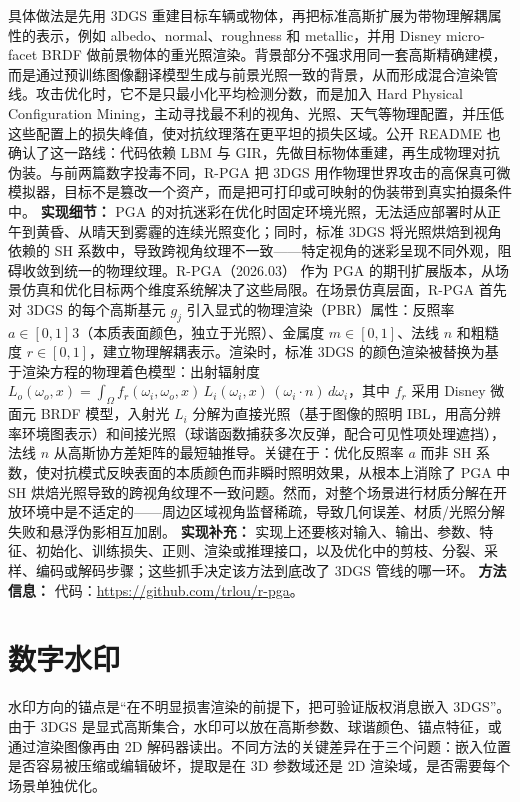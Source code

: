 具体做法是先用 3DGS 重建目标车辆或物体，再把标准高斯扩展为带物理解耦属性的表示，例如 albedo、normal、roughness 和 metallic，并用 Disney micro-facet BRDF 做前景物体的重光照渲染。背景部分不强求用同一套高斯精确建模，而是通过预训练图像翻译模型生成与前景光照一致的背景，从而形成混合渲染管线。攻击优化时，它不是只最小化平均检测分数，而是加入 Hard Physical Configuration Mining，主动寻找最不利的视角、光照、天气等物理配置，并压低这些配置上的损失峰值，使对抗纹理落在更平坦的损失区域。公开 README 也确认了这一路线：代码依赖 LBM 与 GIR，先做目标物体重建，再生成物理对抗伪装。与前两篇数字投毒不同，R-PGA 把 3DGS 用作物理世界攻击的高保真可微模拟器，目标不是篡改一个资产，而是把可打印或可映射的伪装带到真实拍摄条件中。
\textbf{实现细节：} PGA 的对抗迷彩在优化时固定环境光照，无法适应部署时从正午到黄昏、从晴天到雾霾的连续光照变化；同时，标准 3DGS 将光照烘焙到视角依赖的 SH 系数中，导致跨视角纹理不一致——特定视角的迷彩呈现不同外观，阻碍收敛到统一的物理纹理。R-PGA（2026.03） 作为 PGA 的期刊扩展版本，从场景仿真和优化目标两个维度系统解决了这些局限。在场景仿真层面，R-PGA 首先对 3DGS 的每个高斯基元 $g_j$ 引入显式的物理渲染（PBR）属性：反照率 $a \in [0,1]^{}3$（本质表面颜色，独立于光照）、金属度 $m \in [0,1]$、法线 $n$ 和粗糙度 $r \in [0,1]$，建立物理解耦表示。渲染时，标准 3DGS 的颜色渲染被替换为基于渲染方程的物理着色模型：出射辐射度 $L_o(\omega_o, x) = \int_\Omega f_r(\omega_i, \omega_o, x)\, L_i(\omega_i, x)\, (\omega_i \cdot n)\, d\omega_i$，其中 $f_r$ 采用 Disney 微面元 BRDF 模型，入射光 $L_i$ 分解为直接光照（基于图像的照明 IBL，用高分辨率环境图表示）和间接光照（球谐函数捕获多次反弹，配合可见性项处理遮挡），法线 $n$ 从高斯协方差矩阵的最短轴推导。关键在于：优化反照率 $a$ 而非 SH 系数，使对抗模式反映表面的本质颜色而非瞬时照明效果，从根本上消除了 PGA 中 SH 烘焙光照导致的跨视角纹理不一致问题。然而，对整个场景进行材质分解在开放环境中是不适定的——周边区域视角监督稀疏，导致几何误差、材质/光照分解失败和悬浮伪影相互加剧。
\textbf{实现补充：} 实现上还要核对输入、输出、参数、特征、初始化、训练损失、正则、渲染或推理接口，以及优化中的剪枝、分裂、采样、编码或解码步骤；这些抓手决定该方法到底改了 3DGS 管线的哪一环。
\textbf{方法信息：} 代码：\url{https://github.com/trlou/r-pga}。



\section{数字水印}

水印方向的锚点是“在不明显损害渲染的前提下，把可验证版权消息嵌入 3DGS”。由于 3DGS 是显式高斯集合，水印可以放在高斯参数、球谐颜色、锚点特征，或通过渲染图像再由 2D 解码器读出。不同方法的关键差异在于三个问题：嵌入位置是否容易被压缩或编辑破坏，提取是在 3D 参数域还是 2D 渲染域，是否需要每个场景单独优化。


